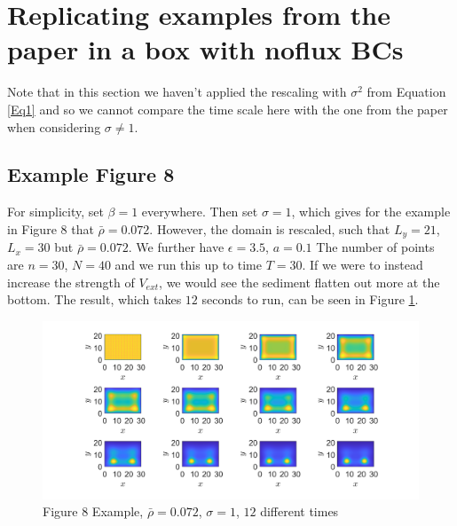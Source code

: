 \documentclass[11pt, a4paper]{article}
\theoremstyle{definition}
\begin{document}
	\section{Replicating examples from the paper in a box with noflux BCs}
	Note that in this section we haven't applied the rescaling with $\sigma^2$ from Equation \eqref{Eq1} and so we cannot compare the time scale here with the one from the paper when considering $\sigma \neq 1$.
	\subsection{Example Figure 8}

	For simplicity, set $\beta = 1$ everywhere. Then set $\sigma = 1$, which gives for the example in Figure 8 that $\bar \rho = 0.072$. However, the domain is rescaled, such that $L_y = 21$, $L_x = 30$ but $\bar \rho = 0.072$. We further have $\epsilon = 3.5$, $a = 0.1$
	The number of points are $n = 30$, $N = 40$ and we run this up to time $T = 30$. If we were to instead increase the strength of $V_{ext}$, we would see the sediment flatten out more at the bottom. The result, which takes $12$ seconds to run, can be seen in Figure \ref{F1}. 
	\begin{figure}[h]
		\centering
		\includegraphics[scale=0.35]{Ex8F1.png}
		\caption{Figure 8 Example, $\bar \rho = 0.072$, $\sigma = 1$, $12$ different times} 
		\label{F1}
	\end{figure} 
	
	
	
\end{document}
